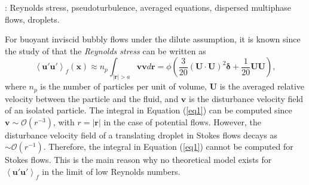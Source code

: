 \documentclass[12pt,a4paper]{article}
\newcommand{\avg}[1]{\left<#1\right>}
\renewcommand{\avg}[1]{\left<#1\right>}
\begin{document}
: Reynolds stress, pseudoturbulence, averaged equations, dispersed multiphase flows, droplets. 

\vspace{10pt}


For buoyant inviscid bubbly flows under the dilute assumption, it is known since the study of \cite{van1982bubble} that the \textit{Reynolds stress} can be written as
\begin{equation}
    \avg{\textbf{u}'\textbf{u}'}_f (\textbf{x})
    \approx
    n_p \int_{|\textbf{r}| > a}\textbf{v}\textbf{v}  d\textbf{r}
    = \phi \left(\frac{3}{20} (\textbf{U}\cdot \textbf{U})^2\bm\delta + \frac{1}{20} \textbf{U}\textbf{U} \right),
    \label{eq1}
\end{equation}
where $n_p$ is the number of particles per unit of volume, $\textbf{U}$ is the averaged relative velocity between the particle and the fluid, and $\textbf{v}$ is the disturbance velocity field of an isolated particle. 
The integral in Equation (\ref{eq1}) can be computed since $\textbf{v} \sim \mathcal{O}(r^{-3})$, with $r =|\textbf{r}|$ in the case of potential flows. 
However, the disturbance velocity field of a translating droplet in Stokes flows decays as $\sim \mathcal{O}(r^{-1})$. 
Therefore, the integral in Equation (\ref{eq1}) cannot be computed for Stokes flows. 
This is the main reason why no theoretical model exists for $\avg{\textbf{u}'\textbf{u}'}_f$ in the limit of low Reynolds numbers. 

 
\end{document}
